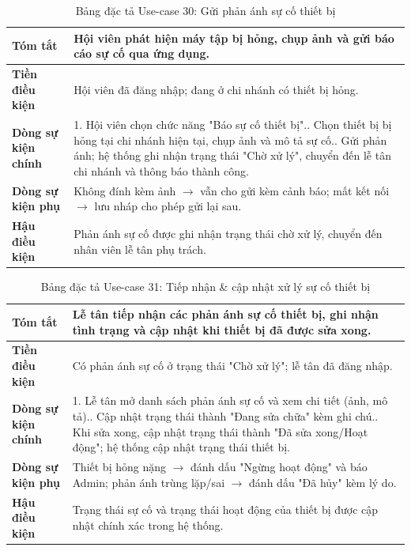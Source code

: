 \documentclass[a4paper,12pt]{article}
\begin{document}
\begin{table}[H]\centering\footnotesize
\begin{tabularx}{\textwidth}{|L{3.2cm}|Y|}
\hline \textbf{Tóm tắt} & Hội viên phát hiện máy tập bị hỏng, chụp ảnh và gửi báo cáo sự cố qua ứng dụng. \\ \hline
\textbf{Tiền điều kiện} & Hội viên đã đăng nhập; đang ở chi nhánh có thiết bị hỏng. \\ \hline
\textbf{Dòng sự kiện chính} & 1. Hội viên chọn chức năng "Báo sự cố thiết bị".. Chọn thiết bị bị hỏng tại chi nhánh hiện tại, chụp ảnh và mô tả sự cố.. Gửi phản ánh; hệ thống ghi nhận trạng thái "Chờ xử lý", chuyển đến lễ tân chi nhánh và thông báo thành công. \\ \hline
\textbf{Dòng sự kiện phụ} & Không đính kèm ảnh $\rightarrow$ vẫn cho gửi kèm cảnh báo; mất kết nối $\rightarrow$ lưu nháp cho phép gửi lại sau. \\ \hline
\textbf{Hậu điều kiện} & Phản ánh sự cố được ghi nhận trạng thái chờ xử lý, chuyển đến nhân viên lễ tân phụ trách. \\ \hline
\end{tabularx}
\caption{Bảng đặc tả Use-case 30: Gửi phản ánh sự cố thiết bị}
\end{table}

\begin{table}[H]\centering\footnotesize
\begin{tabularx}{\textwidth}{|L{3.2cm}|Y|}
\hline \textbf{Tóm tắt} & Lễ tân tiếp nhận các phản ánh sự cố thiết bị, ghi nhận tình trạng và cập nhật khi thiết bị đã được sửa xong. \\ \hline
\textbf{Tiền điều kiện} & Có phản ánh sự cố ở trạng thái "Chờ xử lý"; lễ tân đã đăng nhập. \\ \hline
\textbf{Dòng sự kiện chính} & 1. Lễ tân mở danh sách phản ánh sự cố và xem chi tiết (ảnh, mô tả).. Cập nhật trạng thái thành "Đang sửa chữa" kèm ghi chú.. Khi sửa xong, cập nhật trạng thái thành "Đã sửa xong/Hoạt động"; hệ thống cập nhật trạng thái thiết bị. \\ \hline
\textbf{Dòng sự kiện phụ} & Thiết bị hỏng nặng $\rightarrow$ đánh dấu "Ngừng hoạt động" và báo Admin; phản ánh trùng lặp/sai $\rightarrow$ đánh dấu "Đã hủy" kèm lý do. \\ \hline
\textbf{Hậu điều kiện} & Trạng thái sự cố và trạng thái hoạt động của thiết bị được cập nhật chính xác trong hệ thống. \\ \hline
\end{tabularx}
\caption{Bảng đặc tả Use-case 31: Tiếp nhận \& cập nhật xử lý sự cố thiết bị}
\end{table}
\end{document}
